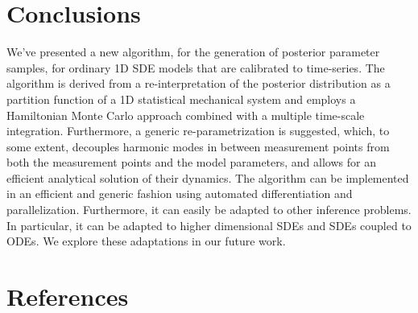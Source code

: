\documentclass[12pt,a4paper,final]{iopart}
\begin{document}


\section{Conclusions}

We've presented a new algorithm, for the generation of posterior parameter samples, for ordinary 1D SDE models that are calibrated to time-series.
The algorithm is derived from a re-interpretation of the posterior distribution as a partition function of a 1D statistical mechanical system and employs a Hamiltonian Monte Carlo approach combined with a multiple time-scale integration.
Furthermore, a generic re-parametrization is suggested, which, to some extent, decouples harmonic modes in between measurement points from both the measurement points and the model parameters, and allows for an efficient analytical solution of their dynamics.
The algorithm can be implemented in an efficient and generic fashion using automated differentiation and parallelization.
Furthermore, it can easily be adapted to other inference problems.
In particular, it can be adapted to higher dimensional SDEs and SDEs coupled to ODEs.
We explore these adaptations in our future work.

\section*{References}


\end{document}
